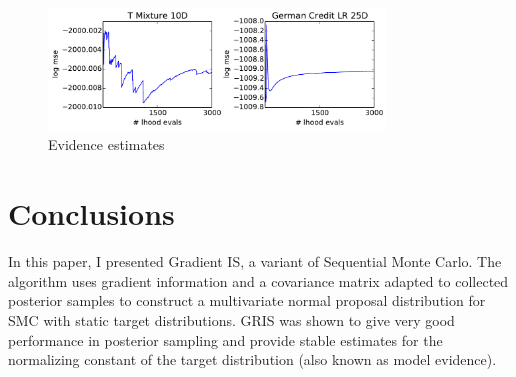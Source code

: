 \begin{figure}[tbp]
\begin{center}
\centering
\includegraphics[width=0.8\textwidth]{figures/evidence_mse_plot.pdf} 
\caption{Evidence estimates}
\label{fig:ev}

\end{center}
\end{figure}


\section{Conclusions}
In this paper, I presented Gradient IS, a variant of Sequential Monte Carlo. The algorithm uses gradient information and  a covariance matrix adapted to collected posterior samples to construct a multivariate normal proposal distribution for SMC with static target distributions. GRIS was shown to give very good performance in posterior sampling and provide stable estimates for the normalizing constant of the target distribution (also known as model evidence).
